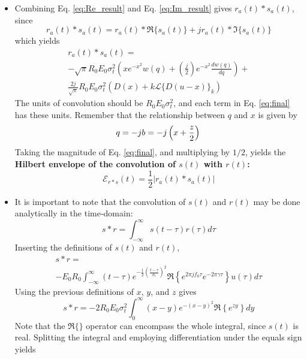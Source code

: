 \documentclass[amsmath,amssymb,aps,prd,10pt,twocolumn,showkeys]{revtex4}
\begin{document}
\begin{itemize}
\item Combining Eq. \ref{eq:Re_result} and Eq. \ref{eq:Im_result} gives $r_a(t) * s_a(t)$, since
\begin{equation}
r_a(t) * s_a(t) = r_a(t) * \Re\lbrace s_a(t)\rbrace + j r_a(t) * \Im\lbrace s_a(t)\rbrace
\end{equation}
which yields
\begin{multline}
r_a(t) * s_a(t) = \\ -\sqrt{\pi} R_0 E_0 \sigma_t^2 \left(x e^{-x^2} w(q) + \left(\frac{j}{2}\right) e^{-x^2} \frac{dw(q)}{dq} \right) + \\ \frac{2j}{\sqrt{\pi}} R_0 E_0 \sigma_t^2 \left(D(x) + k\mathcal{L}\lbrace D(u-x)\rbrace_k\right) \label{eq:final}
\end{multline}
The units of convolution should be $R_0 E_0\sigma_t^2$, and each term in Eq. \ref{eq:final} has these units.  Remember that the relationship between $q$ and $x$ is given by
\begin{equation}
q = -jb = -j\left(x + \frac{z}{2}\right) \\
\end{equation}
Taking the magnitude of Eq. \ref{eq:final}, and multiplying by $1/2$, yields the \textbf{Hilbert envelope of the convolution of $s(t)$ with $r(t)$:}
\begin{equation}
\mathcal{E}_{r * s}(t) = \frac{1}{2} | r_a(t) * s_a(t) | \label{eq:final2}
\end{equation}
\item It is important to note that the convolution of $s(t)$ and $r(t)$ may be done analytically in the time-domain:
\begin{equation}
s * r = \int_{-\infty}^{\infty} s(t-\tau) r(\tau) d\tau 
\end{equation}
Inserting the definitions of $s(t)$ and $r(t)$,
\begin{multline}
s * r = \\ -E_0 R_0 \int_{-\infty}^{\infty} (t-\tau) e^{-\frac{1}{2}\left(\frac{t-\tau}{\sigma_t}\right)^2} \Re\left\lbrace e^{2\pi j f_0 \tau} e^{-2\pi\gamma \tau} \right\rbrace u(\tau) d\tau
\end{multline}
Using the previous definitions of $x$, $y$, and $z$ gives
\begin{equation}
s * r = -2R_0 E_0 \sigma_t^2 \int_{0}^{\infty} (x-y) e^{-(x-y)^2} \Re\left\lbrace e^{zy} \right\rbrace dy
\end{equation}
Note that the $\Re\lbrace \rbrace$ operator can encompass the whole integral, since $s(t)$ is real.  Splitting the integral and employing differentiation under the equals sign yields

\end{itemize}
\end{document}
